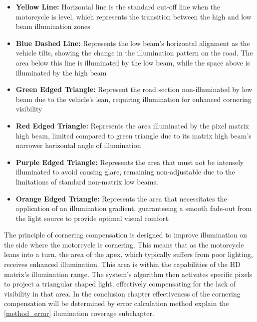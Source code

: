 \begin{itemize}
    \item \textbf{Yellow Line:} Horizontal line is the standard cut-off line when the motorcycle is level, which represents the transition between the high and low beam illumination zones
    \item \textbf{Blue Dashed Line:} Represents the low beam's horizontal alignment as the
    vehicle tilts, showing the change in the illumination pattern on the road. The
    area below this line is illuminated by the low beam, while the space above is
    illuminated by the high beam
    \item \textbf{Green Edged Triangle:} Represent the road section non-illuminated by low
    beam due to the vehicle's lean, requiring illumination for enhanced cornering
    visibility
    \item \textbf{Red Edged Triangle:} Represents the area illuminated by the pixel matrix high
    beam, limited compared to green triangle due to its matrix high beam’s narrower
    horizontal angle of illumination
    \item \textbf{Purple Edged Triangle:} Represents the area that must not be intensely
    illuminated to avoid causing glare, remaining non-adjustable due to the
    limitations of standard non-matrix low beams.
    \item \textbf{Orange Edged Triangle:} Represents the area that necessitates the application
    of an illumination gradient, guaranteeing a smooth fade-out from the light
    source to provide optimal visual comfort.
\end{itemize}

The principle of cornering compensation is designed to improve illumination on the side where the motorcycle is cornering. This means that as the motorcycle leans into a turn, the area of the apex, which typically suffers from poor lighting, receives enhanced illumination. This area is within the capabilities of the HD matrix's illumination range. The system's algorithm then activates specific pixels to project a triangular shaped light, effectively compensating for the lack of visibility in that area.  In the conclusion chapter effectiveness of the cornering compensation will be determined by error calculation method explain the \ref{method_error} ilumination coverage subchapter.

